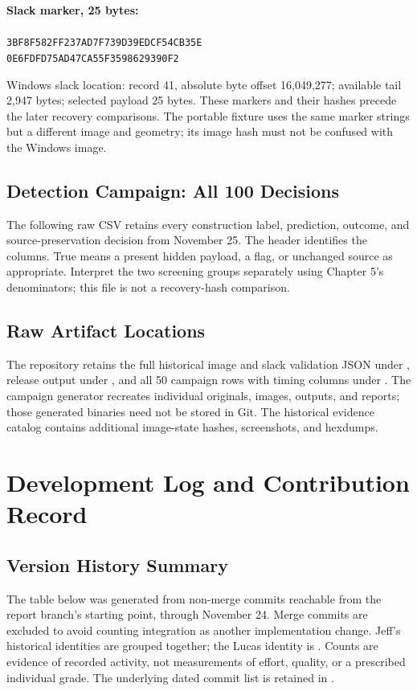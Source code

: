 \medskip\noindent\textbf{Slack marker, 25 bytes:}\\
\\
\texttt{3BF8F582FF237AD7F739D39EDCF54CB35E}\\
\texttt{0E6FDFD75AD47CA55F3598629390F2}

\medskip\noindent Windows slack location: record 41, absolute byte offset
16,049,277; available tail 2,947 bytes; selected payload 25 bytes.
These markers and their hashes precede the later recovery comparisons.
The portable fixture uses the same marker strings but a different image
and geometry; its image hash must not be confused with the Windows image.



\section{Detection Campaign: All 100 Decisions}
The following raw CSV retains every construction label, prediction, outcome,
and source-preservation decision from November 25. The header identifies the
columns. True means a present hidden payload, a flag, or unchanged source as
appropriate. Interpret the two screening groups separately using Chapter 5's
denominators; this file is not a recovery-hash comparison.


\section{Raw Artifact Locations}
The repository retains the full historical image and slack validation JSON
under , release output under
, and all 50 campaign rows with timing
columns under .
The campaign generator recreates individual originals, images, outputs,
and reports; those generated binaries need not be stored in Git. The
historical evidence catalog contains additional image-state hashes,
screenshots, and hexdumps.

\chapter{Development Log and Contribution Record}
\section{Version History Summary}
The table below was generated from non-merge commits reachable from the
report branch's starting point, through November 24. Merge commits are
excluded to avoid counting integration as another implementation change.
Jeff's historical identities are grouped together; the Lucas identity is
. Counts are evidence of recorded activity, not
measurements of effort, quality, or a prescribed individual grade.
The underlying dated commit list is retained in
.

